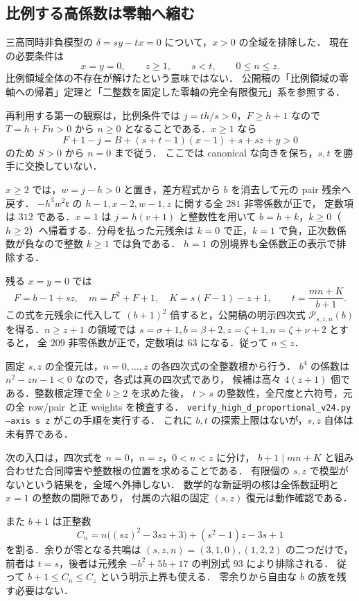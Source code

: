 \subsection{比例する高係数は零軸へ縮む}
\label{nhp24:section}

三高同時非負模型の $\delta=sy-tx=0$ について，$x>0$ の全域を排除した．
現在の必要条件は
\[
 x=y=0,\qquad z\ge1,\qquad s<t,\qquad 0\le n\le z.
\]
比例領域全体の不存在が解けたという意味ではない．
公開稿の「比例領域の零軸への帰着」定理と「二整数を固定した零軸の完全有限復元」系を参照する．

再利用する第一の観察は，比例条件では $j=th/s>0$，$F\ge h+1$ なので
$T=h+Fn>0$ から $n\ge0$ となることである．$x\ge1$ なら
\[
 F+1-j=B+(s+t-1)(x-1)+s+sz+y>0
\]
のため $S>0$ から $n=0$ まで従う．
ここでは canonical な向きを保ち，$s,t$ を勝手に交換していない．

$x\ge2$ では，$w=j-h>0$ と置き，差方程式から $b$ を消去して元の pair 残余へ戻す．
$-h^3w^2\mathfrak r$ の $h-1,x-2,w-1,z$ に関する全 $281$ 非零係数が正で，
定数項は $312$ である．$x=1$ は $j=h(v+1)$ と整数性を用いて
$b=h+k$，$k\ge0$（$h\ge2$）へ帰着する．分母を払った元残余は
$k=0$ で正，$k=1$ で負，正次数係数が負なので整数 $k\ge1$ では負である．
$h=1$ の別境界も全係数正の表示で排除する．

残る $x=y=0$ では
\[
 F=b-1+sz,\quad m=F^2+F+1,\quad K=s(F-1)-z+1,\qquad
 t=\frac{mn+K}{b+1}.
\]
この式を元残余に代入して $(b+1)^2$ 倍すると，公開稿の明示四次式
$\mathcal P_{s,z,n}(b)$ を得る．$n\ge z+1$ の領域では
$s=\sigma+1,b=\beta+2,z=\zeta+1,n=\zeta+\nu+2$ とすると，
全 $209$ 非零係数が正で，定数項は $63$ になる．従って $n\le z$．

固定 $s,z$ の全復元は，$n=0,\ldots,z$ の各四次式の全整数根から行う．
$b^4$ の係数は $n^2-zn-1<0$ なので，各式は真の四次式であり，
候補は高々 $4(z+1)$ 個である．整数根定理で全 $b\ge2$ を求めた後，
$t>s$ の整数性，全尺度と六符号，元の全 row/pair と正 weights を検査する．
\nolinkurl{verify_high_d_proportional_v24.py} \texttt{--axis s z} がこの手順を実行する．
これに $b,t$ の探索上限はないが，$s,z$ 自体は未有界である．

次の入口は，四次式を $n=0$，$n=z$，$0<n<z$ に分け，
$b+1\mid mn+K$ と組み合わせた合同障害や整数根の位置を求めることである．
有限個の $s,z$ で模型がないという結果を，全域へ外挿しない．
数学的な新証明の核は全係数証明と $x=1$ の整数の間隙であり，
付属の六組の固定 $(s,z)$ 復元は動作確認である．

また $b+1$ は正整数
\[
 C_n=n\bigl((sz)^2-3sz+3\bigr)+(s^2-1)z-3s+1
\]
を割る．余りが零となる共鳴は $(s,z,n)=(3,1,0),(1,2,2)$ の二つだけで，
前者は $t=s$，後者は元残余 $-b^2+5b+17$ の判別式 $93$ により排除される．
従って $b+1\le C_n\le C_z$ という明示上界も使える．
零余りから自由な $b$ の族を残す必要はない．
